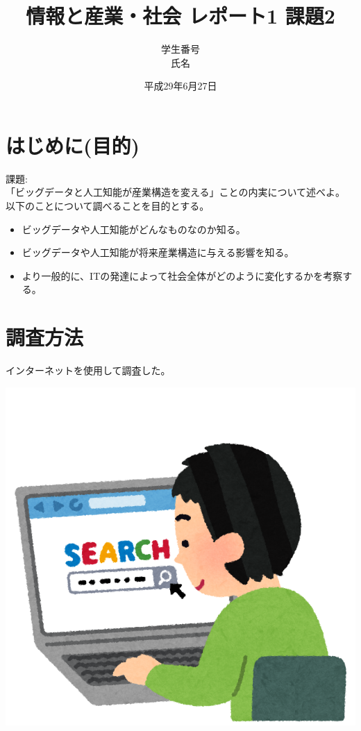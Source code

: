 \documentclass[a4paper,12pt]{jarticle}
\title{情報と産業・社会 レポート1 課題2}
\author{学生番号\\氏名}
\date{平成29年6月27日}
\begin{document}
\maketitle
\tableofcontents
\section{はじめに(目的)}
課題:\\
「ビッグデータと人工知能が産業構造を変える」ことの内実について述べよ。\\
以下のことについて調べることを目的とする。
\begin{itemize}
 \item ビッグデータや人工知能がどんなものなのか知る。
 \item ビッグデータや人工知能が将来産業構造に与える影響を知る。
 \item より一般的に、ITの発達によって社会全体がどのように変化するかを考察する。
\end{itemize}
\newpage
\section{調査方法}
インターネットを使用して調査した。
\begin{center}
\includegraphics[width=100truemm]{computer_search_kensaku.png}
\end{center}
\end{document}
